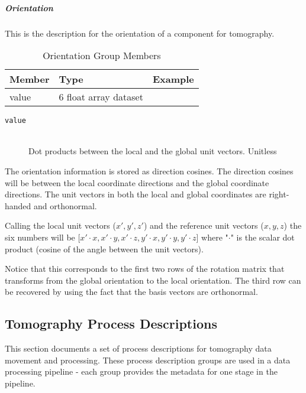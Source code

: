 \normalsize

\subparagraph{Orientation}
\label{tomo:orientation}

This is the description for the orientation of a component for tomography.

\begin{table}[h!]\sffamily \footnotesize
\centering
\caption{Orientation Group Members}
\begin{tabular}{l l l}
\toprule
\bfseries Member     & \bfseries Type & \bfseries Example \\
\midrule

value & 6 float array dataset & \\

\bottomrule
\end{tabular}
\end{table}

\begin{description}
\item[\tt {value}] \hfill \\
{Dot products between the local and the global unit vectors. Unitless}
\end{description}

The orientation information is stored as direction cosines. The direction 
cosines will be between the local coordinate directions and the global 
coordinate directions. The unit vectors in both the local and global 
coordinates are right-handed and orthonormal. 

Calling the local unit vectors ($x',y',z'$) and the reference unit vectors 
($x,y,z$) the six numbers will be [$x' \cdot x, x' \cdot y, x' \cdot z, y' 
\cdot x, y'  \cdot y, y' \cdot z$] where "$\cdot$" is the scalar dot product 
(cosine of the angle between the unit vectors). 

Notice that this corresponds to the first two rows of the rotation matrix 
that transforms from the global orientation to the local orientation. The 
third row can be recovered by using the fact that the basis vectors are 
orthonormal.

\subsection{Tomography Process Descriptions}
This section documents a set of process descriptions for tomography data movement and processing. These process description groups are used in a data processing pipeline - each group provides the metadata for one stage in the pipeline.

